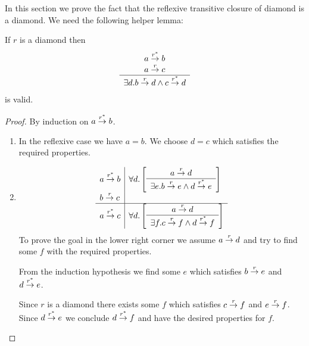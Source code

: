 In this section we prove the fact that the reflexive transitive closure of
diamond is a diamond. We need the following helper lemma:

\begin{lemma}
    \label{StripLemma1}
    If $r$ is a diamond then
    $$
    \begin{array}{c} 
        a \stackrel{r^*}{\to} b
        \\
        a \stackrel{r}{\to} c
     \\ \hline 
        \exists d. b \stackrel{r}{\to} d \land c \stackrel{r^*}{\to} d
    \end{array}
    $$
    is valid.

    \begin{proof}
        By induction on $a \stackrel{r^*}{\to} b$.

        \begin{enumerate}
        \item In the reflexive case we have $a = b$. We choose $d = c$ which
        satisfies the required properties.

        \item
        $$
        \begin{array}{l|l}
            a \stackrel{r^*}{\to} b
            &
            \forall d.
            \left[
            \begin{array}{c} 
                a \stackrel{r}{\to} d
             \\ \hline 
                \exists e. b \stackrel{r}{\to} e \land d \stackrel{r^*}{\to} e
            \end{array}
            \right]
            \\
            b \stackrel{r}{\to} c
            \\
            \hline
            a \stackrel{r^*}{\to} c
            &
            \forall d.
            \left[
            \begin{array}{c} 
                a \stackrel{r}{\to} d
             \\ \hline 
                \exists f. c \stackrel{r}{\to} f \land d \stackrel{r^*}{\to} f
            \end{array}
            \right]
        \end{array}
        $$
        To prove the goal in the lower right corner we assume $a \stackrel{r}{\to} d$ and
        try to find some $f$ with the required properties.

        From the induction hypothesis we find some $e$ which satisfies $b \stackrel{r}{\to} e$ and $d \stackrel{r^*}{\to} e$.

        Since $r$ is a diamond there exists some $f$ which satisfies $c \stackrel{r}{\to}
        f$ and $e \stackrel{r}{\to} f$. Since $d \stackrel{r^*}{\to} e$ we conclude $d
        \stackrel{r^*}{\to} f$ and have the desired properties for $f$.
        \end{enumerate}
    \end{proof}

\end{lemma}



